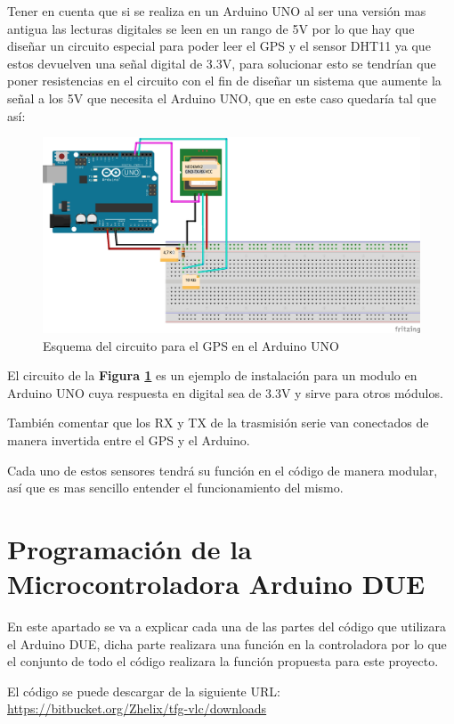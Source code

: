 Tener en cuenta que si se realiza en un Arduino UNO al ser una versión mas antigua las lecturas digitales se leen en un rango de 5V por lo que hay que diseñar un circuito especial para poder leer el GPS y el sensor DHT11 ya que estos devuelven una señal digital de 3.3V, para solucionar esto se tendrían que poner resistencias en el circuito con el fin de diseñar un sistema que aumente la señal a los 5V que necesita el Arduino UNO, que en este caso quedaría tal que así:

\begin{figure}[!h]
	\centering
	\includegraphics[width=0.9\linewidth]{figuras/unogps}
	\caption{Esquema del circuito para el GPS en el Arduino UNO}
	\label{fig:imgunogps}
\end{figure}

El circuito de la \textbf{Figura \ref{fig:imgunogps}} es un ejemplo de instalación para un modulo en Arduino UNO cuya respuesta en digital sea de 3.3V y sirve para otros módulos.

También comentar que los RX y TX de la trasmisión serie van conectados de manera invertida entre el GPS y el Arduino.

Cada uno de estos sensores tendrá su función en el código de manera modular, así que es mas sencillo entender el funcionamiento del mismo.

\section{Programación de la Microcontroladora Arduino DUE}

\setlength{\parindent}{5ex}En este apartado se va a explicar cada una de las partes del código que utilizara el Arduino DUE, dicha parte realizara una función en la controladora por lo que el conjunto de todo el código realizara la función propuesta para este proyecto.
\setlength{\parindent}{0ex}

El código se puede descargar de la siguiente URL: \url{https://bitbucket.org/Zhelix/tfg-vlc/downloads}\\

